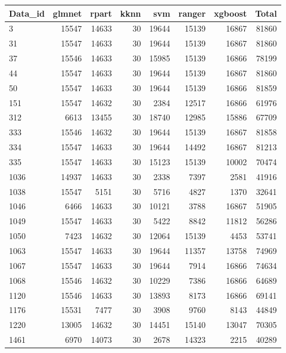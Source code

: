 \documentclass{article}
\begin{document}
\begin{table}[ht]
\centering
\begingroup\scriptsize
\begin{tabular}{lrrrrrrr}
  \hline
Data\_id & glmnet & rpart & kknn & svm & ranger & xgboost & Total \\ 
  \hline
3 & 15547 & 14633 & 30 & 19644 & 15139 & 16867 & 81860 \\ 
  31 & 15547 & 14633 & 30 & 19644 & 15139 & 16867 & 81860 \\ 
  37 & 15546 & 14633 & 30 & 15985 & 15139 & 16866 & 78199 \\ 
  44 & 15547 & 14633 & 30 & 19644 & 15139 & 16867 & 81860 \\ 
  50 & 15547 & 14633 & 30 & 19644 & 15139 & 16866 & 81859 \\ 
  151 & 15547 & 14632 & 30 & 2384 & 12517 & 16866 & 61976 \\ 
  312 & 6613 & 13455 & 30 & 18740 & 12985 & 15886 & 67709 \\ 
  333 & 15546 & 14632 & 30 & 19644 & 15139 & 16867 & 81858 \\ 
  334 & 15547 & 14633 & 30 & 19644 & 14492 & 16867 & 81213 \\ 
  335 & 15547 & 14633 & 30 & 15123 & 15139 & 10002 & 70474 \\ 
  1036 & 14937 & 14633 & 30 & 2338 & 7397 & 2581 & 41916 \\ 
  1038 & 15547 & 5151 & 30 & 5716 & 4827 & 1370 & 32641 \\ 
  1046 & 6466 & 14633 & 30 & 10121 & 3788 & 16867 & 51905 \\ 
  1049 & 15547 & 14633 & 30 & 5422 & 8842 & 11812 & 56286 \\ 
  1050 & 7423 & 14632 & 30 & 12064 & 15139 & 4453 & 53741 \\ 
  1063 & 15547 & 14633 & 30 & 19644 & 11357 & 13758 & 74969 \\ 
  1067 & 15547 & 14633 & 30 & 19644 & 7914 & 16866 & 74634 \\ 
  1068 & 15546 & 14632 & 30 & 10229 & 7386 & 16866 & 64689 \\ 
  1120 & 15546 & 14633 & 30 & 13893 & 8173 & 16866 & 69141 \\ 
  1176 & 15531 & 7477 & 30 & 3908 & 9760 & 8143 & 44849 \\ 
  1220 & 13005 & 14632 & 30 & 14451 & 15140 & 13047 & 70305 \\ 
  1461 & 6970 & 14073 & 30 & 2678 & 14323 & 2215 & 40289 \\ 

\end{tabular}
\end{table}
\end{document}

